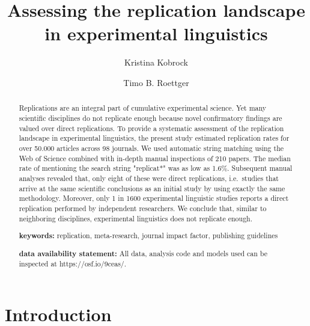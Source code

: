 \documentclass[]{elsarticle} %
\begin{document}
\begin{frontmatter}

  \title{Assessing the replication landscape in experimental linguistics}
    \author[University of Osnabrück]{Kristina Kobrock}
    \author[Universitetet i Oslo]{Timo B. Roettger}
      \address[University of Osnabrück]{University of Osnabrück, Institute of Cognitive Science, Wachsbleiche 27, 49090 Osnabrück, Germany}
    \address[Universitetet i Oslo]{Universitetet i Oslo, Department of Linguistics and Scandinavian Studies, Niels Henrik Abels vei 36, 0313 Oslo, Norway}
  
  \begin{abstract}
  Replications are an integral part of cumulative experimental science. Yet many scientific disciplines do not replicate enough because novel confirmatory findings are valued over direct replications. To provide a systematic assessment of the replication landscape in experimental linguistics, the present study estimated replication rates for over 50.000 articles across 98 journals. We used automatic string matching using the Web of Science combined with in-depth manual inspections of 210 papers. The median rate of mentioning the search string "replicat*" was as low as 1.6\%. Subsequent manual analyses revealed that, only eight of these were direct replications, i.e.~studies that arrive at the same scientific conclusions as an initial study by using exactly the same methodology. Moreover, only 1 in 1600 experimental linguistic studies reports a direct replication performed by independent researchers. We conclude that, similar to neighboring disciplines, experimental linguistics does not replicate enough.

  \textbf{keywords:} replication, meta-research, journal impact factor, publishing guidelines

  \textbf{data availability statement:} All data, analysis code and models used can be inspected at https://osf.io/9ceas/.
  \end{abstract}
  
 \end{frontmatter}

\hypertarget{introduction}{%
\section{Introduction}\label{introduction}}
\end{document}
